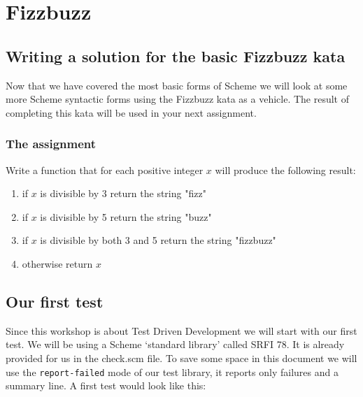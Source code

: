 \documentclass[12pt,a4paper,english,twoside]{article}
\begin{document}
\section{Fizzbuzz}
\subsection{Writing a solution for the basic Fizzbuzz kata}
Now that we have covered the most basic forms of Scheme we will look at some 
more Scheme syntactic forms using the Fizzbuzz kata as a vehicle. The result 
of completing this kata will be used in your next assignment.
\subsubsection{The assignment}
Write a function that for each positive integer $x$ will produce the following 
result:
\begin{enumerate}
  \item if $x$ is divisible by 3 return the string "fizz"
  \item if $x$ is divisible by 5 return the string "buzz"
  \item if $x$ is divisible by both 3 and 5 return the string "fizzbuzz"
  \item otherwise return $x$
\end{enumerate}
\subsection{Our first test}
Since this workshop is about Test Driven Development we will start with our 
first test. We will be using a Scheme `standard library' called SRFI 78. It is 
already provided for us in the check.scm file. To save some space in this 
document we will use the \texttt{report-failed} mode of our test library, it 
reports only failures and a summary line. A first test would look like this:
\end{document}
